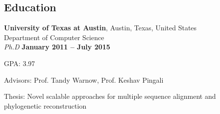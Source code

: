 \documentclass[margin,line,letterpaper]{resume}
\begin{document}
\begin{resume}
    \section{\mysidestyle Education}

    \textbf{University of Texas at Austin}, Austin, Texas, United States\\
    Department of Computer Science\vspace{2mm}\\\vspace{1mm}%
    \textsl{Ph.D} \hfill \textbf{ January 2011 -- July 2015}\vspace{-3mm}\\\vspace{-1mm}%
    \begin{list2}
        \item GPA: 3.97
        \item Advisors:  Prof. Tandy Warnow, Prof. Keshav Pingali
        \item Thesis: Novel scalable approaches for multiple sequence
alignment and phylogenetic reconstruction
    \end{list2}\vspace{-1.5mm}
    

\end{resume}
\end{document}
